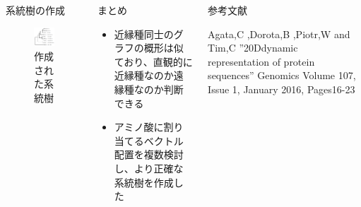 \documentclass[uplatex,dvipdfmx]{beamer}
\begin{document}
\begin{frame}[t]
\begin{columns}[T,onlytextwidth]
\begin{block}{系統樹の作成}
      \begin{figure}[htbp]
        \centering
        \includegraphics[width=100mm]{pic3.png}
        \caption{作成された系統樹}
      \end{figure}

    \end{block}
    
    \begin{block}{まとめ}
      \begin{itemize}
      \item {近縁種同士のグラフの概形は似ており、直観的に近縁種なのか遠縁種なのか判断できる}
      \item {アミノ酸に割り当てるベクトル配置を複数検討し、より正確な系統樹を作成した}
      \end{itemize}

    \end{block}

    \begin{block}{参考文献}
      \begin{thebibliography}{99}
       Agata,C ,Dorota,B ,Piotr,W and Tim,C ”20Ddynamic
      representation of protein sequences” Genomics Volume
      107, Issue 1, January 2016, Pages16-23
      \end{thebibliography}
    \end{block}

  \end{columns}

\end{frame}
\end{document}
